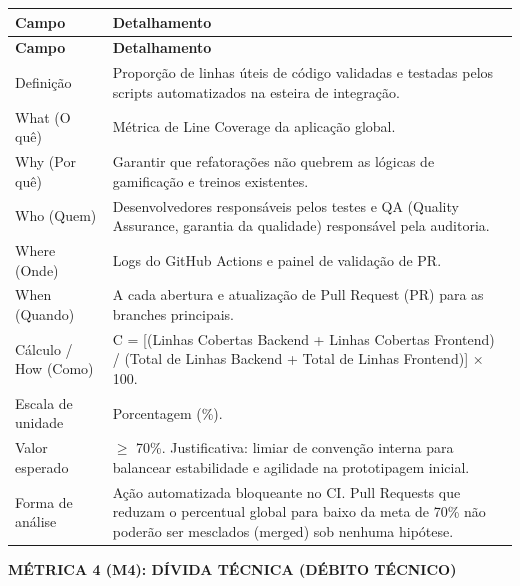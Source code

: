 \begingroup
\small
\setlength{\tabcolsep}{4pt}
\renewcommand{\arraystretch}{1.2}
\begin{longtable}{|>{\raggedright\arraybackslash}p{}|>{\raggedright\arraybackslash}p{}|}
\hline
\textbf{Campo} & \textbf{Detalhamento} \\ \hline
\endfirsthead
\textbf{Campo} & \textbf{Detalhamento} \\ \hline
\endhead
Definição & Proporção de linhas úteis de código validadas e testadas pelos scripts automatizados na esteira de integração. \\ \hline
What (O quê) & Métrica de Line Coverage da aplicação global. \\ \hline
Why (Por quê) & Garantir que refatorações não quebrem as lógicas de gamificação e treinos existentes. \\ \hline
Who (Quem) & Desenvolvedores responsáveis pelos testes e QA (Quality Assurance, garantia da qualidade) responsável pela auditoria. \\ \hline
Where (Onde) & Logs do GitHub Actions e painel de validação de PR. \\ \hline
When (Quando) & A cada abertura e atualização de Pull Request (PR) para as branches principais. \\ \hline
Cálculo / How (Como) & C = [(Linhas Cobertas Backend + Linhas Cobertas Frontend) / (Total de Linhas Backend + Total de Linhas Frontend)] × 100. \\ \hline
Escala de unidade & Porcentagem (\%). \\ \hline
Valor esperado & $\geq$ 70\%. Justificativa: limiar de convenção interna para balancear estabilidade e agilidade na prototipagem inicial. \\ \hline
Forma de análise & Ação automatizada bloqueante no CI. Pull Requests que reduzam o percentual global para baixo da meta de 70\% não poderão ser mesclados (merged) sob nenhuma hipótese. \\ \hline
\end{longtable}
\endgroup

\textbf{MÉTRICA 4 (M4): DÍVIDA TÉCNICA (DÉBITO TÉCNICO)}

